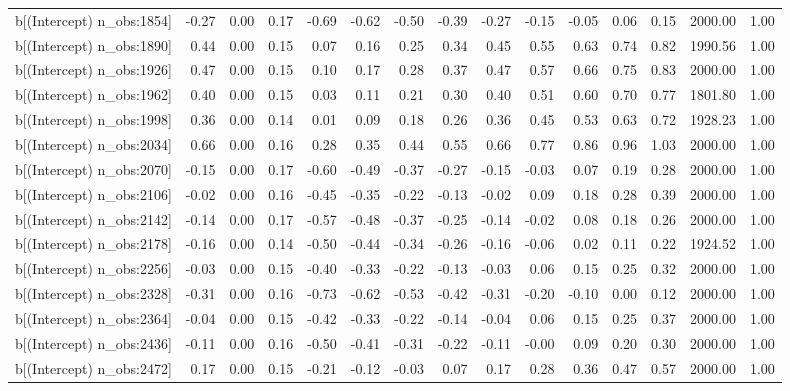 \begin{table}[ht]
\begin{tabular}{rrrrrrrrrrrrrrr}
  b[(Intercept) n\_obs:1854] & -0.27 & 0.00 & 0.17 & -0.69 & -0.62 & -0.50 & -0.39 & -0.27 & -0.15 & -0.05 & 0.06 & 0.15 & 2000.00 & 1.00 \\ 
  b[(Intercept) n\_obs:1890] & 0.44 & 0.00 & 0.15 & 0.07 & 0.16 & 0.25 & 0.34 & 0.45 & 0.55 & 0.63 & 0.74 & 0.82 & 1990.56 & 1.00 \\ 
  b[(Intercept) n\_obs:1926] & 0.47 & 0.00 & 0.15 & 0.10 & 0.17 & 0.28 & 0.37 & 0.47 & 0.57 & 0.66 & 0.75 & 0.83 & 2000.00 & 1.00 \\ 
  b[(Intercept) n\_obs:1962] & 0.40 & 0.00 & 0.15 & 0.03 & 0.11 & 0.21 & 0.30 & 0.40 & 0.51 & 0.60 & 0.70 & 0.77 & 1801.80 & 1.00 \\ 
  b[(Intercept) n\_obs:1998] & 0.36 & 0.00 & 0.14 & 0.01 & 0.09 & 0.18 & 0.26 & 0.36 & 0.45 & 0.53 & 0.63 & 0.72 & 1928.23 & 1.00 \\ 
  b[(Intercept) n\_obs:2034] & 0.66 & 0.00 & 0.16 & 0.28 & 0.35 & 0.44 & 0.55 & 0.66 & 0.77 & 0.86 & 0.96 & 1.03 & 2000.00 & 1.00 \\ 
  b[(Intercept) n\_obs:2070] & -0.15 & 0.00 & 0.17 & -0.60 & -0.49 & -0.37 & -0.27 & -0.15 & -0.03 & 0.07 & 0.19 & 0.28 & 2000.00 & 1.00 \\ 
  b[(Intercept) n\_obs:2106] & -0.02 & 0.00 & 0.16 & -0.45 & -0.35 & -0.22 & -0.13 & -0.02 & 0.09 & 0.18 & 0.28 & 0.39 & 2000.00 & 1.00 \\ 
  b[(Intercept) n\_obs:2142] & -0.14 & 0.00 & 0.17 & -0.57 & -0.48 & -0.37 & -0.25 & -0.14 & -0.02 & 0.08 & 0.18 & 0.26 & 2000.00 & 1.00 \\ 
  b[(Intercept) n\_obs:2178] & -0.16 & 0.00 & 0.14 & -0.50 & -0.44 & -0.34 & -0.26 & -0.16 & -0.06 & 0.02 & 0.11 & 0.22 & 1924.52 & 1.00 \\ 
  b[(Intercept) n\_obs:2256] & -0.03 & 0.00 & 0.15 & -0.40 & -0.33 & -0.22 & -0.13 & -0.03 & 0.06 & 0.15 & 0.25 & 0.32 & 2000.00 & 1.00 \\ 
  b[(Intercept) n\_obs:2328] & -0.31 & 0.00 & 0.16 & -0.73 & -0.62 & -0.53 & -0.42 & -0.31 & -0.20 & -0.10 & 0.00 & 0.12 & 2000.00 & 1.00 \\ 
  b[(Intercept) n\_obs:2364] & -0.04 & 0.00 & 0.15 & -0.42 & -0.33 & -0.22 & -0.14 & -0.04 & 0.06 & 0.15 & 0.25 & 0.37 & 2000.00 & 1.00 \\ 
  b[(Intercept) n\_obs:2436] & -0.11 & 0.00 & 0.16 & -0.50 & -0.41 & -0.31 & -0.22 & -0.11 & -0.00 & 0.09 & 0.20 & 0.30 & 2000.00 & 1.00 \\ 
  b[(Intercept) n\_obs:2472] & 0.17 & 0.00 & 0.15 & -0.21 & -0.12 & -0.03 & 0.07 & 0.17 & 0.28 & 0.36 & 0.47 & 0.57 & 2000.00 & 1.00 \\ 

\end{tabular}
\end{table}
